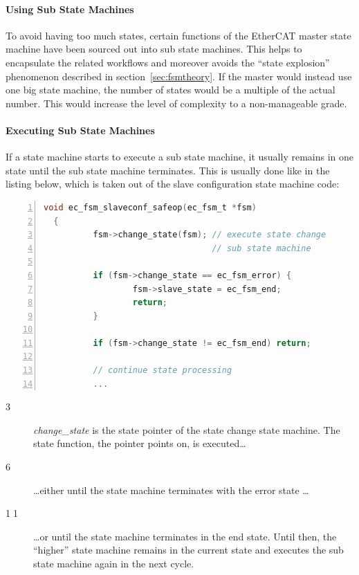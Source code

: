 \documentclass[a4paper,12pt,BCOR6mm,bibtotoc,idxtotoc]{scrbook}
\newcommand{\linenum}[1]{\normalfont\textcircled{\tiny #1}}
\begin{document}
\paragraph{Using Sub State Machines}

To avoid having too much states, certain functions of the EtherCAT master state
machine have been sourced out into sub state machines.  This helps to
encapsulate the related workflows and moreover avoids the ``state explosion''
phenomenon described in section~\ref{sec:fsmtheory}. If the master would
instead use one big state machine, the number of states would be a multiple of
the actual number. This would increase the level of complexity to a
non-manageable grade.

\paragraph{Executing Sub State Machines}

If a state machine starts to execute a sub state machine, it usually
remains in one state until the sub state machine terminates. This is
usually done like in the listing below, which is taken out of the
slave configuration state machine code:

\begin{lstlisting}[gobble=2,language=C,numbers=left]
  void ec_fsm_slaveconf_safeop(ec_fsm_t *fsm)
  {
          fsm->change_state(fsm); // execute state change
                                  // sub state machine

          if (fsm->change_state == ec_fsm_error) {
                  fsm->slave_state = ec_fsm_end;
                  return;
          }

          if (fsm->change_state != ec_fsm_end) return;

          // continue state processing
          ...
\end{lstlisting}

\begin{description}
\item[\linenum{3}] \textit{change\_state} is the
  state pointer of the state change state machine. The state function,
  the pointer points on, is executed\ldots
\item[\linenum{6}] \ldots either until the state
  machine terminates with the error state \ldots
\item[\linenum{11}] \ldots or until the state
  machine terminates in the end state. Until then, the ``higher''
  state machine remains in the current state and executes the sub
  state machine again in the next cycle.
\end{description}
\end{document}
